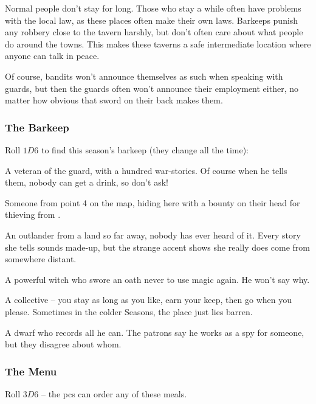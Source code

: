 \begin{multicols}{2}
Normal people don't stay for long.
Those who stay a while often have problems with the local
law, as these places often make their own laws.
Barkeeps punish any robbery close to the tavern harshly, but don't often care about what people do around the towns.
This makes these taverns a safe intermediate location where anyone can talk in peace.

Of course, bandits won't announce themselves as such when speaking with \glspl{guard}, but then the \glspl{guard} often won't announce their employment either, no matter how obvious that sword on their back makes them.

\subsubsection{The Barkeep}

Roll $1D6$ to find this season's barkeep (they change all the time):

\begin{dlist}
  \item
  A veteran of the \gls{guard}, with a hundred war-stories. Of course
  when he tells them, nobody can get a drink, so don't ask!
  \item
  Someone from point 4 on the map, hiding here with a bounty on their head for thieving from .
  \item
  An outlander from a land so far away, nobody has ever heard of it.
  Every story she tells sounds made-up, but the strange accent shows she really does come from somewhere distant.
  \item
  A powerful \gls{witch} who swore an oath never to use magic again.
  He won't say why.
  \item
  A collective -- you stay as long as you like, earn your keep, then go
  when you please. Sometimes in the colder Seasons, the place just lies
  barren.
  \item
  A dwarf who records all he can.
  The patrons say he works as a spy for someone, but they disagree about whom.
\end{dlist}

\subsubsection{The Menu}

Roll $3D6$ -- the \glspl{pc} can order any of these meals.

\newcommand\menuItem[3][(\arabic{r12} \glspl{cp})]{%
  \randomdozen%
  \randomthree%
  \randomfourB%
  \ifodd\value{enumi}
    \randomthreeC%
    \randomfour%
  \fi
  \item
  \textbf{#2:}
  #3
  #1
}


\end{multicols}
